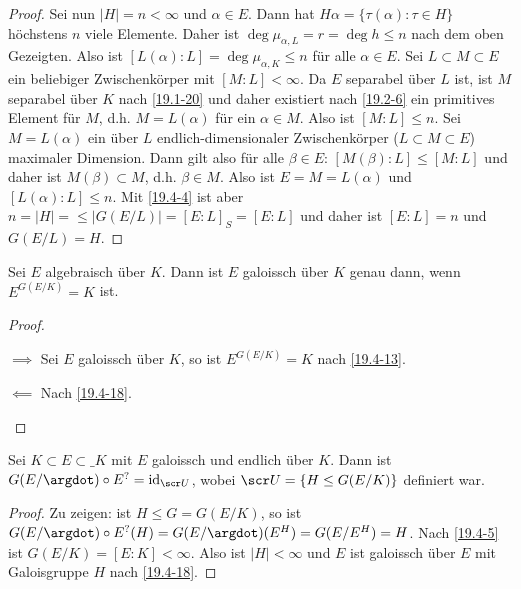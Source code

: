 \begin{st}[Artin]
\begin{proof}
		Sei nun $|H| = n < \infty$ und $\alpha \in E$.
		Dann hat $H\alpha = \{ \tau(\alpha) : \tau \in H \}$ höchstens $n$ viele Elemente.
		Daher ist $\deg \mu_{\alpha, L} = r = \deg h \le n$ nach dem oben Gezeigten. 
		Also ist $[L(\alpha) : L] = \deg \mu_{\alpha, K} \le n$ für alle $\alpha \in E$.
		Sei $L \subset M \subset E$ ein beliebiger Zwischenkörper mit $[M: L] < \infty$.
		Da $E$ separabel über $L$ ist, ist $M$ separabel über $K$ nach \ref{19.1-20} und daher existiert nach \ref{19.2-6} ein primitives Element für $M$, d.h. $M = L(\alpha)$ für ein $\alpha \in M$.
		Also ist $[M : L] \le n$.
		Sei $M = L(\alpha)$ ein über $L$ endlich-dimensionaler Zwischenkörper ($L \subset M \subset E$) maximaler Dimension.
		Dann gilt also für alle $\beta \in E$: $[M(\beta) : L] \le [M : L]$ und daher ist $M(\beta) \subset M$, d.h. $\beta \in M$.
		Also ist $E = M = L(\alpha)$ und $[L(\alpha) : L] \le n$.
		Mit \ref{19.4-4} ist aber $n = |H| = \le |G(E/L)| = [E:L]_S = [E : L]$ und daher ist $[E : L] = n$ und $G(E / L) = H$.
	\end{proof}
\end{st}

\begin{kor} \label{19.4-19}
	Sei $E$ algebraisch über $K$.
	Dann ist $E$ galoissch über $K$ genau dann, wenn $E^{G(E / K)} = K$ ist.
	\begin{proof}
		\begin{segnb}{$\implies$}
			Sei $E$ galoissch über $K$, so ist $E^{G(E/K)} = K$ nach \ref{19.4-13}.
		\end{segnb}
		\begin{segnb}{$\impliedby$}
			Nach \ref{19.4-18}.
		\end{segnb}
	\end{proof}
\end{kor}

\begin{kor} \label{19.4-20}
	Sei $K \subset E \subset \_K$ mit $E$ galoissch und endlich über $K$.
	Dann ist $G(E / \argdot) \circ E^? = \id_{\scr U}$, wobei $\scr U = \{ H \le G(E / K) \}$ definiert war.
	\begin{proof}
		Zu zeigen: ist $H \le G = G(E / K)$, so ist $G(E / \argdot) \circ E^? (H) = G(E / \argdot) (E^H) = G(E / E^H) = H$.
		Nach \ref{19.4-5} ist $G(E / K) = [E : K] < \infty$.
		Also ist $|H| < \infty$ und $E$ ist galoissch über $E$ mit Galoisgruppe $H$ nach \ref{19.4-18}.
	\end{proof}
\end{kor}


